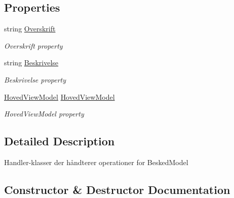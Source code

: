 \subsection*{Properties}
\begin{DoxyCompactItemize}
\item 
string \hyperlink{class__1aarsproeve_1_1_handler_1_1_hoved_handler_a325c1c3209bf296a54e71cf0ed1212a8}{Overskrift}
\begin{DoxyCompactList}\small\item\em Overskrift property \end{DoxyCompactList}\item 
string \hyperlink{class__1aarsproeve_1_1_handler_1_1_hoved_handler_a9772d2ca7148e87a831dcfded52b8304}{Beskrivelse}
\begin{DoxyCompactList}\small\item\em Beskrivelse property \end{DoxyCompactList}\item 
\hyperlink{class__1aarsproeve_1_1_view_model_1_1_hoved_view_model}{Hoved\+View\+Model} \hyperlink{class__1aarsproeve_1_1_handler_1_1_hoved_handler_a967641be7f28016b11d379c950e5f1a3}{Hoved\+View\+Model}
\begin{DoxyCompactList}\small\item\em Hoved\+View\+Model property \end{DoxyCompactList}\end{DoxyCompactItemize}


\subsection{Detailed Description}
Handler-\/klasser der håndterer operationer for Besked\+Model 



\subsection{Constructor \& Destructor Documentation}
\hypertarget{class__1aarsproeve_1_1_handler_1_1_hoved_handler_ad0d900d482d4780d1a75a91eea9b5a4f}{}
